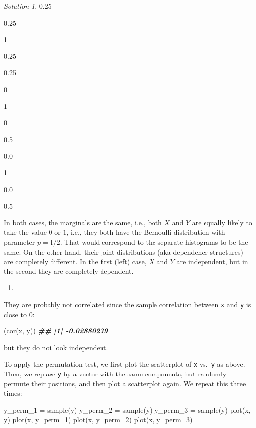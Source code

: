 \documentclass[
]{book}
\newenvironment{Shaded}{\begin{snugshade}}{\end{snugshade}}
\newcommand{\DocumentationTok}[1]{\textcolor[rgb]{0.56,0.35,0.01}{\textbf{\textit{#1}}}}
\newcommand{\FunctionTok}[1]{\textcolor[rgb]{0.00,0.00,0.00}{#1}}
\newcommand{\NormalTok}[1]{#1}
\newcommand{\OtherTok}[1]{\textcolor[rgb]{0.56,0.35,0.01}{#1}}
\providecommand{\tightlist}{%
  \setlength{\itemsep}{0pt}\setlength{\parskip}{0pt}}
\theoremstyle{definition}
\theoremstyle{definition}
\theoremstyle{definition}
\theoremstyle{definition}
\theoremstyle{remark}
\newtheorem*{solution}{Solution}
\begin{document}
\begin{solution}
0.25

0.25

1

0.25

0.25

0

1

0

0.5

0.0

1

0.0

0.5

In both cases, the marginals are the same, i.e., both \(X\) and \(Y\) are equally
likely to take the value \(0\) or \(1\), i.e., they both have the Bernoulli
distribution with parameter \(p=1/2\). That would correspond to the separate
histograms to be the same. On the other hand, their joint distributions (aka
dependence structures) are completely different. In the first (left) case, \(X\)
and \(Y\) are independent, but in the second they are completely dependent.

\begin{enumerate}
\def\labelenumi{\arabic{enumi}.}
\setcounter{enumi}{2}
\tightlist
\item
\end{enumerate}

They are probably not correlated since the sample correlation between \texttt{x}
and \texttt{y} is close to \(0\):

\begin{Shaded}
\begin{Highlighting}[]
\NormalTok{(}\FunctionTok{cor}\NormalTok{(x, y))}
\DocumentationTok{\#\# [1] {-}0.02880239}
\end{Highlighting}
\end{Shaded}

but they do not look independent.

To apply the permutation test, we first plot the scatterplot of \texttt{x} vs.~\texttt{y} as
above. Then, we replace \texttt{y} by a vector with the same components, but randomly
permute their positions, and then plot a scatterplot again. We repeat this three
times:

\begin{Shaded}
\begin{Highlighting}[]
\NormalTok{y\_perm\_1 }\OtherTok{=} \FunctionTok{sample}\NormalTok{(y)}
\NormalTok{y\_perm\_2 }\OtherTok{=} \FunctionTok{sample}\NormalTok{(y)}
\NormalTok{y\_perm\_3 }\OtherTok{=} \FunctionTok{sample}\NormalTok{(y)}
\FunctionTok{plot}\NormalTok{(x, y)}
\FunctionTok{plot}\NormalTok{(x, y\_perm\_1)}
\FunctionTok{plot}\NormalTok{(x, y\_perm\_2)}
\FunctionTok{plot}\NormalTok{(x, y\_perm\_3)}
\end{Highlighting}
\end{Shaded}


\end{solution}
\end{document}
